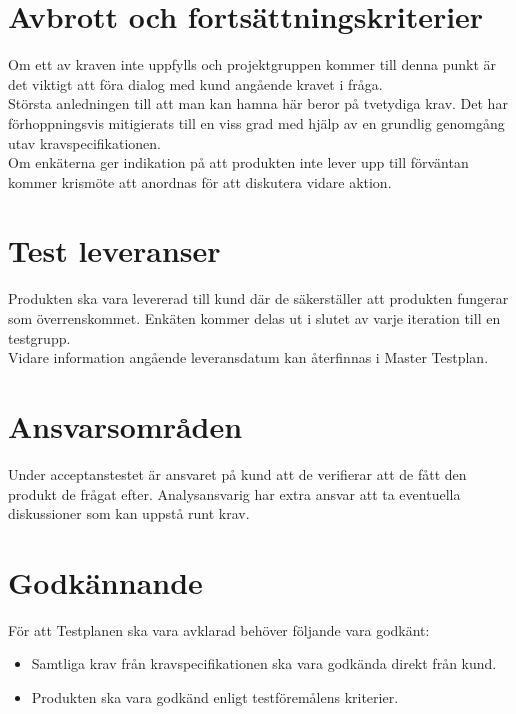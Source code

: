 \section{Avbrott och fortsättningskriterier}
	Om ett av kraven inte uppfylls och projektgruppen kommer till denna punkt är det viktigt att föra dialog med kund angående kravet i fråga.\\
	
	Största anledningen till att man kan hamna här beror på tvetydiga krav. Det har förhoppningsvis mitigierats till en viss grad med hjälp av en grundlig genomgång utav kravspecifikationen.\\

	Om enkäterna ger indikation på att produkten inte lever upp till förväntan kommer krismöte att anordnas för att diskutera vidare aktion.


\section{Test leveranser }
	Produkten ska vara levererad till kund där de säkerställer att produkten fungerar som överrenskommet. Enkäten kommer delas ut i slutet av varje iteration till en testgrupp.\\

	Vidare information angående leveransdatum kan återfinnas i Master Testplan.



\section{Ansvarsområden}
	Under acceptanstestet är ansvaret på kund att de verifierar att de fått den produkt de frågat efter. Analysansvarig har extra ansvar att ta eventuella diskussioner som kan uppstå runt krav.






\section{Godkännande}
	För att Testplanen ska vara avklarad behöver följande vara godkänt:
	\begin{itemize}
	 \item Samtliga krav från kravspecifikationen ska vara godkända direkt från kund.
	\item Produkten ska vara godkänd enligt testföremålens kriterier.
	\end{itemize}



\printbibliography






